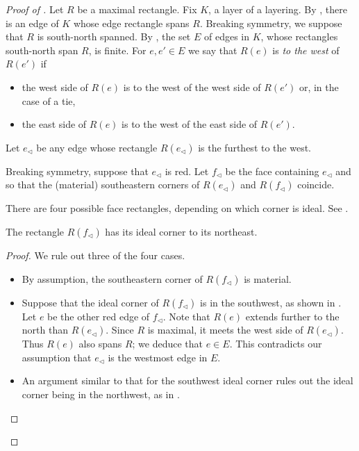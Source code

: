 \documentclass[12pt]{amsart}
\begin{document}
\begin{proof}[Proof of ]
Let $R$ be a maximal rectangle.  Fix $K$, a layer of a layering.  By , there is an edge of $K$ whose edge rectangle spans $R$.  Breaking symmetry, we suppose that $R$ is south-north spanned.  By , the set $E$ of edges in $K$, whose rectangles south-north span $R$, is finite.  For $e, e' \in E$ we say that $R(e)$ is \emph{to the west} of $R(e')$ if 
\begin{itemize}
\item the west side of $R(e)$ is to the west of the west side of $R(e')$ or, in the case of a tie, 
\item the east side of $R(e)$ is to the west of the east side of $R(e')$.
\end{itemize}

\noindent 
Let $e_\triangleleft$ be any edge whose rectangle $R(e_\triangleleft)$ is the furthest to the west. 

Breaking symmetry, suppose that $e_\triangleleft$ is red.  Let $f_\triangleleft$ be the face containing $e_\triangleleft$ and so that the (material) southeastern corners of $R(e_\triangleleft)$ and $R(f_\triangleleft)$ coincide. 

There are four possible face rectangles, depending on which corner is ideal. See . 

\begin{claim*}
The rectangle $R(f_\triangleleft)$ has its ideal corner to its northeast. 
\end{claim*}

\begin{proof}
We rule out three of the four cases.
\begin{itemize}
\item 
By assumption, the southeastern corner of $R(f_\triangleleft)$ is material.
\item 
Suppose that the ideal corner of $R(f_\triangleleft)$ is in the southwest, as shown in .  Let $e$ be the other red edge of $f_\triangleleft$. Note that $R(e)$ extends further to the north than $R(e_\triangleleft)$. Since $R$ is maximal, it meets the west side of $R(e_\triangleleft)$. Thus $R(e)$ also spans $R$; we deduce that $e \in E$. This contradicts our assumption that $e_\triangleleft$ is the westmost edge in $E$. 
\item 
An argument similar to that for the southwest ideal corner rules out the ideal corner being in the northwest, as in .  \qedhere
\end{itemize}
\end{proof}


\end{proof}
\end{document}
